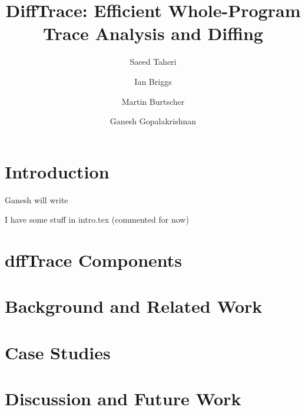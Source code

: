 \documentclass[review,sigconf]{acmart}
\begin{document}
\title{ DiffTrace: Efficient Whole-Program Trace Analysis and Diffing}


\author{Saeed Taheri}

\author{Ian Briggs}

\author{Martin Burtscher}

\author{Ganesh Gopalakrishnan}






\begin{abstract}
\label{abs}

\end{abstract}


\maketitle


\section{Introduction}
\label{sec:intro}

Ganesh will write

I have some stuff in intro.tex (commented for now)
%



\section{dffTrace Components}
\label{sec:components}



\section{Background and Related Work}
\label{sec:bgreltool}



\section{Case Studies}
\label{sec:case}


    
\section{Discussion and Future Work}
\label{sec:discussion}





\end{document}
